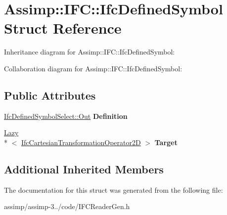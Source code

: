 \hypertarget{struct_assimp_1_1_i_f_c_1_1_ifc_defined_symbol}{\section{Assimp\+:\+:I\+F\+C\+:\+:Ifc\+Defined\+Symbol Struct Reference}
\label{struct_assimp_1_1_i_f_c_1_1_ifc_defined_symbol}
}


Inheritance diagram for Assimp\+:\+:I\+F\+C\+:\+:Ifc\+Defined\+Symbol\+:


Collaboration diagram for Assimp\+:\+:I\+F\+C\+:\+:Ifc\+Defined\+Symbol\+:
\subsection*{Public Attributes}
\begin{DoxyCompactItemize}
\item 
\hypertarget{struct_assimp_1_1_i_f_c_1_1_ifc_defined_symbol_aceb0d01509fed4a958301f1e7c23d81b}{\hyperlink{classboost_1_1shared__ptr}{Ifc\+Defined\+Symbol\+Select\+::\+Out} {\bfseries Definition}}\label{struct_assimp_1_1_i_f_c_1_1_ifc_defined_symbol_aceb0d01509fed4a958301f1e7c23d81b}

\item 
\hypertarget{struct_assimp_1_1_i_f_c_1_1_ifc_defined_symbol_a3e5588430a4195ed372fbee06d443bdb}{\hyperlink{struct_assimp_1_1_s_t_e_p_1_1_lazy}{Lazy}\\*
$<$ \hyperlink{struct_assimp_1_1_i_f_c_1_1_ifc_cartesian_transformation_operator2_d}{Ifc\+Cartesian\+Transformation\+Operator2\+D} $>$ {\bfseries Target}}\label{struct_assimp_1_1_i_f_c_1_1_ifc_defined_symbol_a3e5588430a4195ed372fbee06d443bdb}

\end{DoxyCompactItemize}
\subsection*{Additional Inherited Members}


The documentation for this struct was generated from the following file\+:\begin{DoxyCompactItemize}
\item 
assimp/assimp-\/3../code/I\+F\+C\+Reader\+Gen.\+h\end{DoxyCompactItemize}
